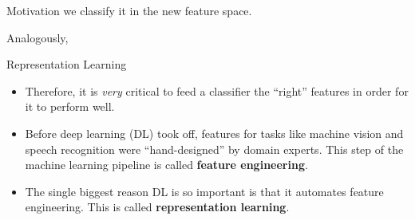 \documentclass[11pt,compress,t,notes=noshow]{beamer}
\begin{document}
\begin{frame} {Motivation}
   \small{we classify it in the new feature space.}
  \begin{figure}
    \centering
  \end{figure}
  \small{Analogously, }
  \begin{figure}
    \centering
  \end{figure}
\end{frame}

\begin{frame} {Representation Learning}
  \begin{itemize}
    \vspace{5mm}
    \item Therefore, it is \textit{very} critical to feed a classifier the \enquote{right} features in order for it to perform well.
    \vspace{7mm}
    \item Before deep learning (DL) took off, features for tasks like machine vision and speech recognition were \enquote{hand-designed} by domain experts. This step of the machine learning pipeline is called \textbf{feature engineering}.
    \vspace{7mm}
    \item The single biggest reason DL is so important is that it automates feature engineering. This is called \textbf{representation learning}.
  \end{itemize}
\end{frame}
\end{document}
